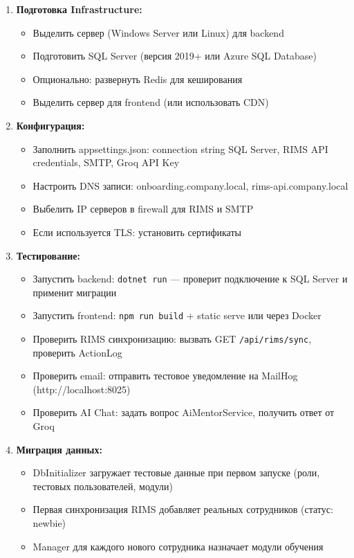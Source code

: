 \begin{enumerate}
	\item \textbf{Подготовка Infrastructure:}
	\begin{itemize}
		\item Выделить сервер (Windows Server или Linux) для backend
		\item Подготовить SQL Server (версия 2019+ или Azure SQL Database)
		\item Опционально: развернуть Redis для кеширования
		\item Выделить сервер для frontend (или использовать CDN)
	\end{itemize}
	
	\item \textbf{Конфигурация:}
	\begin{itemize}
		\item Заполнить appsettings.json: connection string SQL Server, RIMS API credentials, SMTP, Groq API Key
		\item Настроить DNS записи: onboarding.company.local, rims-api.company.local
		\item Выбелить IP серверов в firewall для RIMS и SMTP
		\item Если используется TLS: установить сертификаты
	\end{itemize}
	
	\item \textbf{Тестирование:}
	\begin{itemize}
		\item Запустить backend: \texttt{dotnet run} --- проверит подключение к SQL Server и применит миграции
		\item Запустить frontend: \texttt{npm run build} + static serve или через Docker
		\item Проверить RIMS синхронизацию: вызвать GET \texttt{/api/rims/sync}, проверить ActionLog
		\item Проверить email: отправить тестовое уведомление на MailHog (http://localhost:8025)
		\item Проверить AI Chat: задать вопрос AiMentorService, получить ответ от Groq
	\end{itemize}
	
	\item \textbf{Миграция данных:}
	\begin{itemize}
		\item DbInitializer загружает тестовые данные при первом запуске (роли, тестовых пользователей, модули)
		\item Первая синхронизация RIMS добавляет реальных сотрудников (статус: newbie)
		\item Manager для каждого нового сотрудника назначает модули обучения
	\end{itemize}
	

\end{enumerate}
